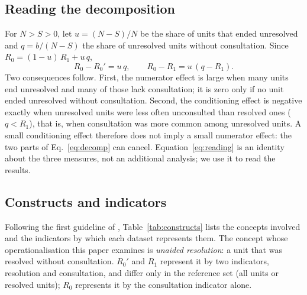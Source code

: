 \documentclass[pdflatex,sn-basic]{sn-jnl}
\newcommand{\Rz}{\ensuremath{R_0}}
\newcommand{\Rzp}{\ensuremath{R_0'}}
\newcommand{\Ro}{\ensuremath{R_1}}
\begin{document}
\subsection{Reading the decomposition}

For $N > S > 0$, let $u = (N-S)/N$ be the share of units that ended unresolved and $q = b/(N-S)$ the share of unresolved units without consultation. Since $\Rz = (1-u)\,\Ro + u\,q$,
\begin{equation}\label{eq:reading}
\Rz - \Rzp = u\,q, \qquad \Rz - \Ro = u\,(q - \Ro).
\end{equation}
Two consequences follow. First, the numerator effect is large when many units end unresolved and many of those lack consultation; it is zero only if no unit ended unresolved without consultation. Second, the conditioning effect is negative exactly when unresolved units were less often unconsulted than resolved ones ($q < \Ro$), that is, when consultation was more common among unresolved units. A small conditioning effect therefore does not imply a small numerator effect: the two parts of Eq.~\eqref{eq:decomp} can cancel. Equation~\eqref{eq:reading} is an identity about the three measures, not an additional analysis; we use it to read the results.

\subsection{Constructs and indicators}

Following the first guideline of \citet{sjoberg2023}, Table~\ref{tab:constructs} lists the concepts involved and the indicators by which each dataset represents them. The concept whose operationalisation this paper examines is \emph{unaided resolution}: a unit that was resolved without consultation. \Rzp{} and \Ro{} represent it by two indicators, resolution and consultation, and differ only in the reference set (all units or resolved units); \Rz{} represents it by the consultation indicator alone.
\end{document}
